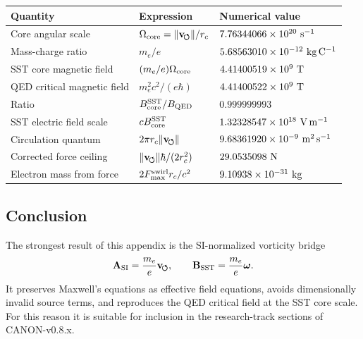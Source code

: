 \begin{center}
    \begin{tabular}{lll}
        \hline
        Quantity & Expression & Numerical value \\
        \hline
        Core angular scale &
        \(\Omega_{\rm core}=\lVert\mathbf{v}_{\!\boldsymbol{\circlearrowleft}}\rVert/r_c\) &
        \(7.76344066\times10^{20}\ {\rm s^{-1}}\) \\
        
        Mass-charge ratio &
        \(m_e/e\) &
        \(5.68563010\times10^{-12}\ {\rm kg\,C^{-1}}\) \\
        
        SST core magnetic field &
        \((m_e/e)\Omega_{\rm core}\) &
        \(4.41400519\times10^9\ {\rm T}\) \\
        
        QED critical magnetic field &
        \(m_e^2c^2/(e\hbar)\) &
        \(4.41400522\times10^9\ {\rm T}\) \\
        
        Ratio &
        \(B_{\rm core}^{\rm SST}/B_{\rm QED}\) &
        \(0.999999993\) \\
        
        SST electric field scale &
        \(cB_{\rm core}^{\rm SST}\) &
        \(1.32328547\times10^{18}\ {\rm V\,m^{-1}}\) \\
        
        Circulation quantum &
        \(2\pi r_c\lVert\mathbf{v}_{\!\boldsymbol{\circlearrowleft}}\rVert\) &
        \(9.68361920\times10^{-9}\ {\rm m^2\,s^{-1}}\) \\
        
        Corrected force ceiling &
        \(\lVert\mathbf{v}_{\!\boldsymbol{\circlearrowleft}}\rVert\hbar/(2r_c^2)\) &
        \(29.0535098\ {\rm N}\) \\
        
        Electron mass from force &
        \(2F_{\max}^{\rm swirl}r_c/c^2\) &
        \(9.10938\times10^{-31}\ {\rm kg}\) \\
        \hline
    \end{tabular}
\end{center}

\subsection{Conclusion}

The strongest result of this appendix is the SI-normalized vorticity
bridge
\[
    \mathbf{A}_{\rm SI}
    =
    \frac{m_e}{e}\mathbf{v}_{\!\boldsymbol{\circlearrowleft}},
    \qquad
    \mathbf{B}_{\rm SST}
    =
    \frac{m_e}{e}\boldsymbol{\omega}.
\]
It preserves Maxwell's equations as effective field equations, avoids
dimensionally invalid source terms, and reproduces the QED critical field
at the SST core scale.  For this reason it is suitable for inclusion in
the research-track sections of CANON-v0.8.x.

